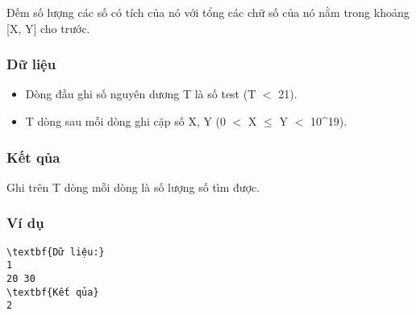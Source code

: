 



   Đếm số lượng các số có tích của nó với tổng các chữ số của nó nằm trong khoảng [X, Y] cho trước.  

\subsubsection{   Dữ liệu  }
\begin{itemize}
	\item     Dòng đầu ghi số nguyên dương T là số test (T $<$ 21).   
	\item     T dòng sau mỗi dòng ghi cặp số X, Y (0 $<$ X  $\le$  Y $<$ 10^19).   
\end{itemize}

\subsubsection{   Kết qủa  }

   Ghi trên T dòng mỗi dòng là số lượng số tìm được.  

\subsubsection{   Ví dụ  }
\begin{verbatim}
\textbf{Dữ liệu:} 
1
20 30
\textbf{Kết qủa} 
2
\end{verbatim}
